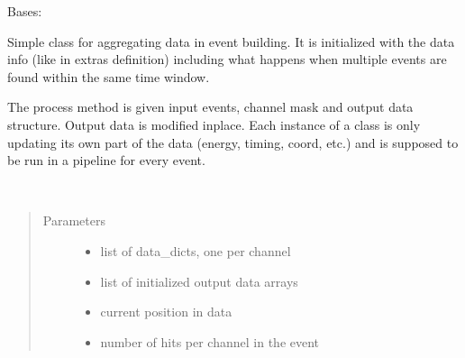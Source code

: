 \documentclass[letterpaper,10pt,english]{sphinxmanual}
\begin{document}

\begin{fulllineitems}
\label{\detokenize{autodocs/data:listmode.data.ColProcessor}}
\sphinxAtStartPar
Bases: 

\sphinxAtStartPar
Simple class for aggregating data in event building.
It is initialized with the data info (like in extras definition) including
what happens when multiple events are found within the same time window.

\sphinxAtStartPar
The process method is given input events, channel mask and output data structure.
Output data is modified in\sphinxhyphen{}place. Each instance of a class is only updating its own
part of the data (energy, timing, coord, etc.) and is supposed to be run in a pipeline
for every event.

\begin{fulllineitems}
\label{\detokenize{autodocs/data:listmode.data.ColProcessor.process}}~\begin{quote}\begin{description}
\item[{Parameters}] \leavevmode\begin{itemize}
\item {} 
\sphinxAtStartPar
{} \textendash{} list of data\_dicts, one per channel

\item {} 
\sphinxAtStartPar
{} \textendash{} list of initialized output data arrays

\item {} 
\sphinxAtStartPar
{} \textendash{} current position in data

\item {} 
\sphinxAtStartPar
{} \textendash{} number of hits per channel in the event


\end{itemize}
\end{description}
\end{quote}
\end{fulllineitems}
\end{fulllineitems}
\end{document}

